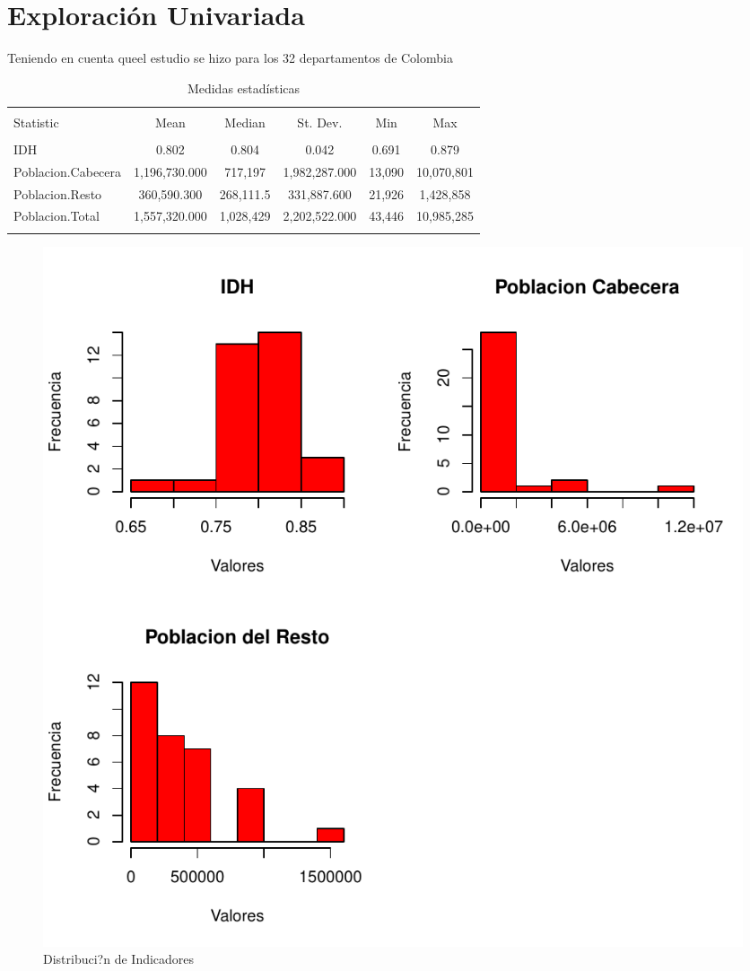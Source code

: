 \section{Exploración Univariada}\label{univariada}




Teniendo en cuenta queel estudio se hizo para los 32 departamentos de Colombia

\begin{table}[!htbp] \centering 
  \caption{Medidas estadísticas} 
  \label{stats} 
\begin{tabular}{@{\extracolsep{5pt}}lccccc} 
\\[-1.8ex]\hline 
\hline \\[-1.8ex] 
Statistic & \multicolumn{1}{c}{Mean} & \multicolumn{1}{c}{Median} & \multicolumn{1}{c}{St. Dev.} & \multicolumn{1}{c}{Min} & \multicolumn{1}{c}{Max} \\ 
\hline \\[-1.8ex] 
IDH & 0.802 & 0.804 & 0.042 & 0.691 & 0.879 \\ 
Poblacion.Cabecera & 1,196,730.000 & 717,197 & 1,982,287.000 & 13,090 & 10,070,801 \\ 
Poblacion.Resto & 360,590.300 & 268,111.5 & 331,887.600 & 21,926 & 1,428,858 \\ 
Poblacion.Total & 1,557,320.000 & 1,028,429 & 2,202,522.000 & 43,446 & 10,985,285 \\ 
\hline \\[-1.8ex] 
\end{tabular} 
\end{table} \centering




\begin{figure}[h]
\centering
\includegraphics{univariada-hist}
\caption{Distribuci?n de Indicadores}
\label{hist}
\end{figure}

